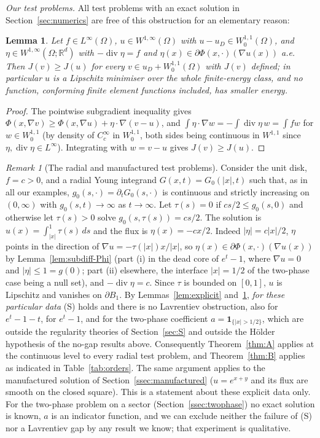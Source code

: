 \documentclass[11pt]{amsart}
\newtheorem{lemma}[theorem]{Lemma}
\theoremstyle{definition}
\theoremstyle{remark}
\newtheorem{remark}[theorem]{Remark}
\numberwithin{equation}{section}
\newcommand{\R}{\mathbb{R}}
\newcommand{\abs}[1]{\lvert #1\rvert}
\DeclareMathOperator{\divg}{div}
\begin{document}
\emph{Our test problems.} All test problems with an exact solution in Section~\ref{sec:numerics} are free of this obstruction for an elementary reason:
\begin{lemma}\label{lem:nogap}
Let $f\in L^\infty(\Omega)$, $u\in W^{1,\infty}(\Omega)$ with $u-u_D\in W^{1,1}_0(\Omega)$, and $\eta\in W^{1,\infty}(\Omega;\R^d)$ with $-\divg\eta=f$ and $\eta(x)\in\partial\Phi(x,\cdot)(\nabla u(x))$ a.e. Then $J(v)\ge J(u)$ for every $v\in u_D+W^{1,1}_0(\Omega)$ with $J(v)$ defined; in particular $u$ is a Lipschitz minimiser over the whole finite-energy class, and no function, conforming finite element functions included, has smaller energy.
\end{lemma}
\begin{proof}
The pointwise subgradient inequality gives $\Phi(x,\nabla v)\ge\Phi(x,\nabla u)+\eta\cdot\nabla(v-u)$, and $\int\eta\cdot\nabla w=-\int\divg\eta\,w=\int fw$ for $w\in W^{1,1}_0$ (by density of $C^\infty_c$ in $W^{1,1}_0$, both sides being continuous in $W^{1,1}$ since $\eta,\divg\eta\in L^\infty$). Integrating with $w=v-u$ gives $J(v)\ge J(u)$.
\end{proof}

\begin{remark}[The radial and manufactured test problems]\label{rem:radial-S}
Consider the unit disk, $f=c>0$, and a radial Young integrand $G(x,t)=G_0(\abs x,t)$ such that, as in all our examples, $g_0(s,\cdot)=\partial_tG_0(s,\cdot)$ is continuous and strictly increasing on $(0,\infty)$ with $g_0(s,t)\to\infty$ as $t\to\infty$. Let $\tau(s)=0$ if $cs/2\le g_0(s,0)$ and otherwise let $\tau(s)>0$ solve $g_0(s,\tau(s))=cs/2$. The solution is $u(x)=\int_{\abs x}^1\tau(s)\,ds$ and the flux is $\eta(x)=-cx/2$. Indeed $\abs\eta=c\abs x/2$, $\eta$ points in the direction of $\nabla u=-\tau(\abs x)x/\abs x$, so $\eta(x)\in\partial\Phi(x,\cdot)(\nabla u(x))$ by Lemma~\ref{lem:subdiff-Phi} (part (i) in the dead core of $e^t-1$, where $\nabla u=0$ and $\abs\eta\le1=g(0)$; part (ii) elsewhere, the interface $\abs x=1/2$ of the two-phase case being a null set), and $-\divg\eta=c$. Since $\tau$ is bounded on $[0,1]$, $u$ is Lipschitz and vanishes on $\partial B_1$. By Lemmas~\ref{lem:explicit} and~\ref{lem:nogap}, \emph{for these particular data} (S) holds and there is no Lavrentiev obstruction, also for $e^t-1-t$, for $e^t-1$, and for the two-phase coefficient $a=\mathbf 1_{\{\abs x>1/2\}}$, which are outside the regularity theories of Section~\ref{sec:S} and outside the H\"older hypothesis of the no-gap results above. Consequently Theorem~\ref{thm:A} applies at the continuous level to every radial test problem, and Theorem~\ref{thm:B} applies as indicated in Table~\ref{tab:orders}. The same argument applies to the manufactured solution of Section~\ref{ssec:manufactured} ($u=e^{x+y}$ and its flux are smooth on the closed square). This is a statement about these explicit data only. For the two-phase problem on a sector (Section~\ref{ssec:twophase}) no exact solution is known, $a$ is an indicator function, and we can exclude neither the failure of (S) nor a Lavrentiev gap by any result we know; that experiment is qualitative.
\end{remark}
\end{document}
